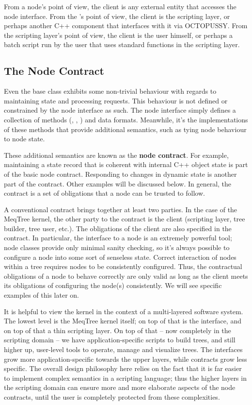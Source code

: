   From a node's point of view, the client is any external entity that accesses
  the node interface. From the 's point of view, the client is
  the scripting layer, or perhaps another C++ component that interfaces with it
  via OCTOPUSSY. From the scripting layer's point of view, the client is the
  user himself, or perhaps a batch script run by the user that uses standard
  functions in the scripting layer.

\subsection{The Node Contract}

  Even the base  class exhibits some non-trivial behaviour with
  regards to maintaining state and processing requests. This behaviour is not
  defined or constrained by the node interface as such. The node interface
  simply defines a collection of methods (, ,
  ) and data formats. Meanwhile, it's the implementations of
  these methods that provide additional semantics, such as tying node behaviour
  to node state.

  These additional semantics are known as the {\bf node contract}. For example,
  maintaining a state record that is coherent with internal C++ object state is
  part of the basic node contract. Responding to changes in dynamic state is
  another part of the contract. Other examples will be discussed below. In
  general, the contract is a set of obligations that a node can be trusted to
  follow.
  
  A conventional contract brings together at least two parties. In the case of
  the MeqTree kernel, the other party to the contract is the client  (scripting
  layer, tree builder, tree user, etc.). The obligations of the client are also
  specified in the contract. In particular, the  interface to a
  node is an extremely powerful tool; node classes provide only minimal sanity
  checking, so it's always possible to configure a node into some sort of
  senseless state. Correct interaction of nodes within a tree requires nodes to
  be consistently configured. Thus, the contractual obligations of a node to
  behave correctly are only valid as long as the client meets its obligations
  of configuring the node(s) consistently. We will see specific examples of
  this later on.
  
  It is helpful to view the kernel in the context of a multi-layered software
  system. The lowest level is the MeqTree kernel itself; on top of that is the
   interface, and on top of that a thin scripting layer. On top
  of that -- now completely in the scripting domain -- we have
  application-specific scripts to build trees, and still higher up, user-level
  tools to operate, manage and visualize trees. The interfaces grow more
  application-specific towards the upper layers, while contracts grow less
  specific. The overall design philosophy here relies on the fact that it is
  far easier to implement complex semantics in a scripting language; thus the
  higher layers in the scripting domain can ensure more and more elaborate
  aspects of the node contracts, until the user is completely protected from
  these complexities. 

